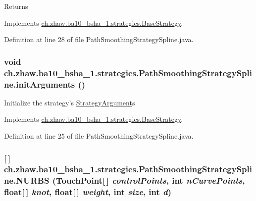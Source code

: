\begin{DoxyReturn}{Returns}

\end{DoxyReturn}


Implements \hyperlink{classch_1_1zhaw_1_1ba10__bsha__1_1_1strategies_1_1BaseStrategy_aa0ebed55eed45409bad13d43a0058780}{ch.zhaw.ba10\_\-bsha\_\-1.strategies.BaseStrategy}.

Definition at line 28 of file PathSmoothingStrategySpline.java.\hypertarget{classch_1_1zhaw_1_1ba10__bsha__1_1_1strategies_1_1PathSmoothingStrategySpline_aa3b240dfbae6e57c599c82a7542c0802}{
\subsubsection[{initArguments}]{\setlength{\rightskip}{0pt plus 5cm}void ch.zhaw.ba10\_\-bsha\_\-1.strategies.PathSmoothingStrategySpline.initArguments ()}}
\label{classch_1_1zhaw_1_1ba10__bsha__1_1_1strategies_1_1PathSmoothingStrategySpline_aa3b240dfbae6e57c599c82a7542c0802}
Initialize the strategy's \hyperlink{classch_1_1zhaw_1_1ba10__bsha__1_1_1StrategyArgument}{StrategyArgument}s 

Implements \hyperlink{classch_1_1zhaw_1_1ba10__bsha__1_1_1strategies_1_1BaseStrategy_a0496e8fd0099a5f0f7765322d7e752a9}{ch.zhaw.ba10\_\-bsha\_\-1.strategies.BaseStrategy}.

Definition at line 25 of file PathSmoothingStrategySpline.java.\hypertarget{classch_1_1zhaw_1_1ba10__bsha__1_1_1strategies_1_1PathSmoothingStrategySpline_af58eb333b4b6ee0e1808b1bd68cbca69}{
\subsubsection[{NURBS}]{ \mbox{[}$\,$\mbox{]} ch.zhaw.ba10\_\-bsha\_\-1.strategies.PathSmoothingStrategySpline.NURBS ({\bf TouchPoint}\mbox{[}$\,$\mbox{]} {\em controlPoints}, \/  int {\em nCurvePoints}, \/  float\mbox{[}$\,$\mbox{]} {\em knot}, \/  float\mbox{[}$\,$\mbox{]} {\em weight}, \/  int {\em size}, \/  int {\em d})}}
\label{classch_1_1zhaw_1_1ba10__bsha__1_1_1strategies_1_1PathSmoothingStrategySpline_af58eb333b4b6ee0e1808b1bd68cbca69}


